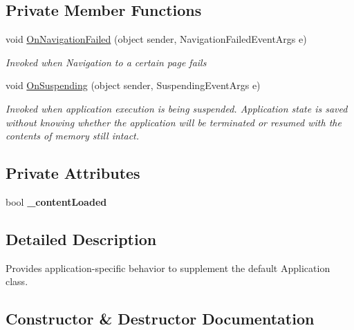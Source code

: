 \subsection*{Private Member Functions}
\begin{DoxyCompactItemize}
\item 
void \mbox{\hyperlink{classepicture_test_1_1_app_adec3d812ca9ceee7eff2ad6b9684fe7f}{On\+Navigation\+Failed}} (object sender, Navigation\+Failed\+Event\+Args e)
\begin{DoxyCompactList}\small\item\em Invoked when Navigation to a certain page fails \end{DoxyCompactList}\item 
void \mbox{\hyperlink{classepicture_test_1_1_app_afd75e91ae3342f538aedc20e398f8f4a}{On\+Suspending}} (object sender, Suspending\+Event\+Args e)
\begin{DoxyCompactList}\small\item\em Invoked when application execution is being suspended. Application state is saved without knowing whether the application will be terminated or resumed with the contents of memory still intact. \end{DoxyCompactList}\end{DoxyCompactItemize}
\subsection*{Private Attributes}
\begin{DoxyCompactItemize}
\item 
\mbox{\label{classepicture_test_1_1_app_af0124bfdcd32ce132d304217c798cc76}} 
bool {\bfseries \+\_\+content\+Loaded}
\end{DoxyCompactItemize}


\subsection{Detailed Description}
Provides application-\/specific behavior to supplement the default Application class. 



\subsection{Constructor \& Destructor Documentation}
\mbox{\label{classepicture_test_1_1_app_a66466105413d6f032cc51d14e38b8248}} 
